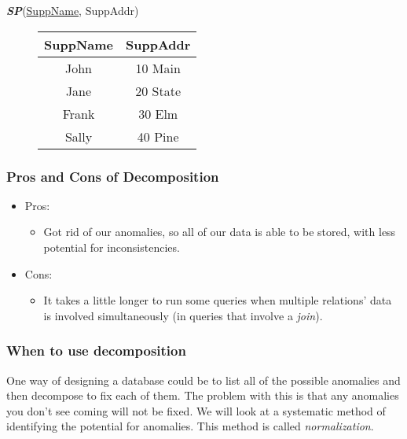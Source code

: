 \documentclass{report}
\begin{document}
    \bigbreak \noindent
    \textit{\textbf{SP}}(\underline{SuppName}, SuppAddr)
        \begin{figure}[ht]
        \centering
          \setlength{\tabcolsep}{45}
        \begin{tabular}{c c}
            \hline
            SuppName & SuppAddr \\
            \hline
            John & 10 Main \\
            \hline
            Jane & 20 State \\
            \hline
            Frank & 30 Elm \\
            \hline
            Sally & 40 Pine \\
            \hline
        \end{tabular}
        \end{figure}
        \subsubsection{Pros and Cons of Decomposition}
        \begin{itemize}
            \item Pros:
                \begin{itemize}[label=$\circ$]
                    \item Got rid of our anomalies, so all of our data is able to be stored, with less potential for inconsistencies.
                \end{itemize}
            \item Cons:
                \begin{itemize}[label=$\circ$]
                    \item It takes a little longer to run some queries when multiple relations' data is involved simultaneously (in queries that involve a \textit{join}).
                \end{itemize}
        \end{itemize}
        \subsubsection{When to use decomposition}
        One way of designing a database could be to list all of the possible anomalies and then decompose to fix each of them. The problem with this is that any anomalies you don't see coming will not be fixed. 
        \bigbreak \noindent
        We will look at a systematic method of identifying the potential for anomalies. This method is called \textit{normalization}.
\end{document}
